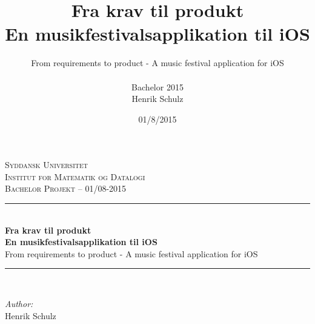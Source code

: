 \documentclass[a4paper,10pt,titlepage]{article}
\title{Fra krav til produkt \\ En musikfestivalsapplikation til iOS}
\author{From requirements to product - A music festival application for iOS\\ \\Bachelor 2015\\Henrik Schulz}
\date{01/8/2015}
\begin{document}
\begin{titlepage}

\newcommand{\HRule}{\rule{\linewidth}{0.5mm}} %

\center %

\textsc{\LARGE Syddansk Universitet\\\vspace{0.2cm}Institut for Matematik og Datalogi}\\[1.5cm] %
\textsc{\large Bachelor Projekt -- 01/08-2015}\\[0.5cm] %

\HRule \\[0.4cm]
{\huge \bfseries Fra krav til produkt \\En musikfestivalsapplikation til iOS}\\[0.4cm] 
{From requirements to product - A music festival application for iOS}
\HRule \\[1.5cm]

\begin{minipage}{0.3\textwidth}
\begin{flushleft} \large
\emph{Author:}\\
Henrik Schulz\\


\end{flushleft}
\end{minipage}
\end{titlepage}
\end{document}
